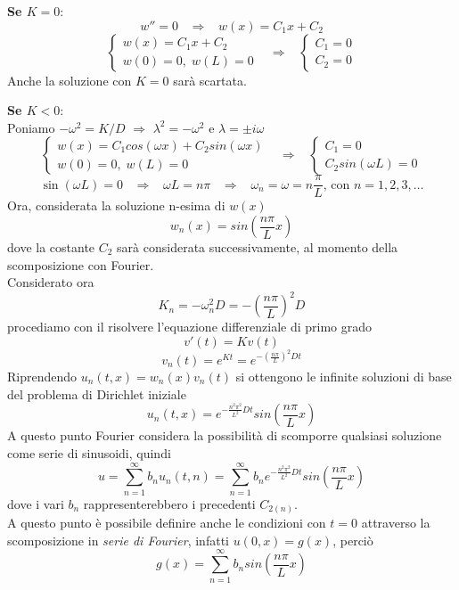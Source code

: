 {\bf Se $K=0$}:
\[
	w''=0
	\;\;\;
	\Rightarrow
	\;\;\;
	w(x)=C_1x + C_2
\]
\[
	\left\{
	\begin{array}{l}
		w(x)=C_1x + C_2\\
		w(0)=0, \; w(L)=0
	\end{array}
	\right.
	\;\;\;
	\Rightarrow
	\;\;\;
	\left\{
	\begin{array}{l}
		C_1=0\\
		C_2=0
	\end{array}
	\right.
\]
Anche la soluzione con $K=0$ sar\`a scartata.

{\bf Se $K<0$}:\\
Poniamo $-\omega^2 = K/D$ $\Rightarrow$ $\lambda^2 = - \omega^2$ e $\lambda=\pm
i\omega$
\[
	\left\{
	\begin{array}{l}
		w(x)=C_1 cos(\omega x) + C_2 sin(\omega x)\\
		w(0)=0, \; w(L)=0
	\end{array}
	\right.
	\;\;\;
	\Rightarrow
	\;\;\;
	\left\{
	\begin{array}{l}
		C_1=0\\
		C_2 sin(\omega L)= 0
	\end{array}
	\right.
\]
\[
	\sin (\omega L)=0
	\;\;\;
	\Rightarrow
	\;\;\;
	\omega L = n\pi
	\;\;\;
	\Rightarrow
	\;\;\;
	\omega_n= \omega= n \frac{\pi}{L} \text{, con }n=1,2,3,\ldots
\]
Ora, considerata la soluzione n-esima di $w(x)$
\[
	w_n(x)=sin\left(\frac{n\pi}{L}x \right)
\]
dove la costante $C_2$ sar\`a considerata successivamente, al momento della
scomposizione con Fourier.\\
Considerato ora
\[
	K_n=-\omega_n^2 D= -\left(\frac{n\pi}{L}\right)^2D
\]
procediamo con il risolvere l'equazione differenziale di primo grado
\[
	v'(t)= Kv(t)
\]
\[
	v_n(t)= e^{Kt}=e^{-\left(\frac{n\pi}{L}\right)^2Dt}
\]
Riprendendo  $u_n(t,x)= w_n(x) v_n(t)$ si ottengono le infinite soluzioni
di base del problema di Dirichlet iniziale
\[
	u_n(t,x)= e^{-\frac{n^2\pi^2}{L^2} Dt}
	sin\left(\frac{n\pi}{L}x \right)
\]
A questo punto Fourier considera la possibilit\`a di scomporre qualsiasi
soluzione come serie di sinusoidi, quindi
\[
	u= \sum_{n=1}^{\infty} b_n u_n(t,n)=
	\sum_{n=1}^{\infty}b_n e^{-\frac{n^2\pi^2}{L^2} Dt}
	sin\left(\frac{n\pi}{L}x \right)
\]
dove i vari $b_n$ rappresenterebbero i precedenti $C_{2(n)}$.\\
A questo punto \`e possibile definire anche le condizioni con $t=0$ attraverso
la scomposizione in \textit{serie di Fourier}, infatti $u(0,x)=g(x)$, perci\`o
\[
	g(x)= \sum_{n=1}^{\infty} b_n sin\left(\frac{n\pi}{L}x \right)
\]
